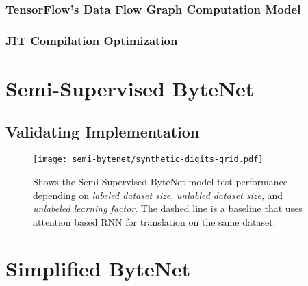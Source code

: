 \subsubsection{TensorFlow's Data Flow Graph Computation Model}

\subsubsection{JIT Compilation Optimization}

\clearpage
\section{Semi-Supervised ByteNet}

\subsection{Validating Implementation}
\begin{figure}[H]
    \centering
    \texttt{[image: semi-bytenet/synthetic-digits-grid.pdf]}
    \caption{Shows the Semi-Supervised ByteNet model test performance depending on \textit{labeled dataset size}, \textit{unlabled dataset size}, and \textit{unlabeled learning factor}. The dashed line is a baseline that uses attention based RNN for translation on the same dataset.}
\end{figure}

\clearpage
\section{Simplified ByteNet}
